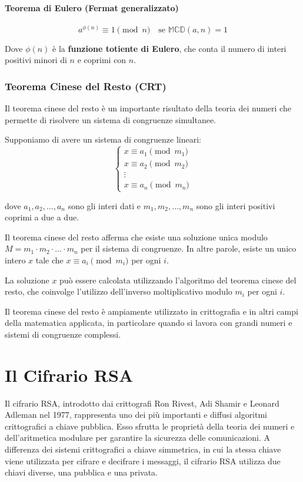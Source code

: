 \documentclass[a4paper,12pt]{report}
\begin{document}
\subsubsection*{Teorema di Eulero (Fermat generalizzato)}

$$a^{\phi(n)} \equiv 1 \pmod{n} \quad \text{se } \mathbb{MCD}(a,n) = 1$$

Dove $\phi(n)$ è la \textbf{funzione totiente di Eulero}, che conta il numero di interi positivi minori di $n$ e coprimi con $n$.

\subsection*{Teorema Cinese del Resto (CRT)} \label{sec:cinese}
Il teorema cinese del resto è un importante risultato della teoria dei numeri che permette di risolvere un sistema di congruenze simultanee. 

Supponiamo di avere un sistema di congruenze lineari:
\[\begin{cases}
x \equiv a_1 \pmod{m_1} \\
x \equiv a_2 \pmod{m_2} \\
\vdots \\
x \equiv a_n \pmod{m_n}
\end{cases}\]

dove $a_1, a_2, \ldots, a_n$ sono gli interi dati e $m_1, m_2, \ldots, m_n$ sono gli interi positivi coprimi a due a due.

Il teorema cinese del resto afferma che esiste una soluzione unica modulo $M = m_1 \cdot m_2 \cdot \ldots \cdot m_n$ per il sistema di congruenze. In altre parole, esiste un unico intero $x$ tale che $x \equiv a_i \pmod{m_i}$ per ogni $i$.

La soluzione $x$ può essere calcolata utilizzando l'algoritmo del teorema cinese del resto, che coinvolge l'utilizzo dell'inverso moltiplicativo modulo $m_i$ per ogni $i$.

Il teorema cinese del resto è ampiamente utilizzato in crittografia e in altri campi della matematica applicata, in particolare quando si lavora con grandi numeri e sistemi di congruenze complessi.
%
%
%
%
%
%
%
%
%
%
%
%
%
%
%
%
%
%
%
%
%
%
%
%
%
%
%
%
%
%
%
%
%
%
%
%
%
%
%
%
%
\chapter{Il Cifrario RSA}
Il cifrario RSA, introdotto dai crittografi Ron Rivest, Adi Shamir e Leonard Adleman nel 1977, rappresenta uno dei più importanti e diffusi algoritmi crittografici a chiave pubblica. 
Esso sfrutta le proprietà della teoria dei numeri e dell'aritmetica modulare per garantire la sicurezza delle comunicazioni. 
A differenza dei sistemi crittografici a chiave simmetrica, in cui la stessa chiave viene utilizzata per cifrare e decifrare i messaggi, il cifrario RSA utilizza due chiavi diverse, una pubblica e una privata.
\end{document}
